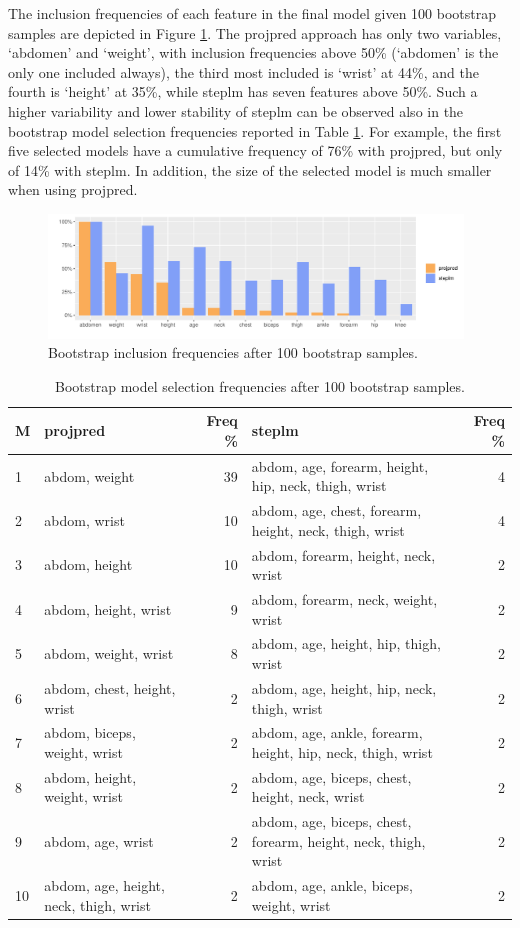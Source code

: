 \documentclass[american,]{article}
\theoremstyle{definition}
\begin{document}
The inclusion frequencies of each feature in the final model given 100
bootstrap samples are depicted in Figure
\ref{fig:inclusion_frequencies}. The projpred approach has only two
variables, `abdomen' and `weight', with inclusion frequencies above
50\% (`abdomen' is the only one included always), the third most
included is `wrist' at 44\%, and the fourth is `height' at 35\%, while
steplm has seven features above 50\%. Such a higher variability and
lower stability of steplm can be observed also in the bootstrap model
selection frequencies reported in Table
\ref{tab:model_frequencies}. For example, the first five selected
models have a cumulative frequency of 76\% with projpred, but only of
14\% with steplm. In addition, the size of the selected model is much
smaller when using projpred.
\begin{figure}[tp]
  \centering
  \includegraphics[width=0.98\textwidth]{graphics/inc_prob.pdf}
  \caption{Bootstrap inclusion frequencies after 100 bootstrap samples.}
  \label{fig:inclusion_frequencies}
\end{figure}


\begin{table}[tp]
\scriptsize
\centering
\begin{tabular}{l|lr|lr}
M & projpred & Freq \% & steplm & Freq \%  \\ 
  \hline
1 & abdom, weight & 39 & abdom, age, forearm, height, hip, neck, thigh, wrist & 4 \\
2 & abdom, wrist & 10 & abdom, age, chest, forearm, height, neck, thigh, wrist & 4 \\
3 & abdom, height & 10 & abdom, forearm, height, neck, wrist & 2 \\
4 & abdom, height, wrist & 9 & abdom, forearm, neck, weight, wrist & 2 \\
5 & abdom, weight, wrist & 8 & abdom, age, height, hip, thigh, wrist & 2 \\
6 & abdom, chest, height, wrist & 2 & abdom, age, height, hip, neck, thigh, wrist & 2 \\
7 & abdom, biceps, weight, wrist & 2 & abdom, age, ankle, forearm, height, hip, neck, thigh, wrist & 2 \\
8 & abdom, height, weight, wrist & 2 & abdom, age, biceps, chest, height, neck, wrist & 2 \\
9 & abdom, age, wrist & 2 & abdom, age, biceps, chest, forearm, height, neck, thigh, wrist & 2 \\
10 & abdom, age, height, neck, thigh, wrist & 2 & abdom, age, ankle, biceps, weight, wrist & 2 \\
\end{tabular}
\caption{Bootstrap model selection frequencies after 100 bootstrap samples.}
\label{tab:model_frequencies}
\end{table}
\end{document}
